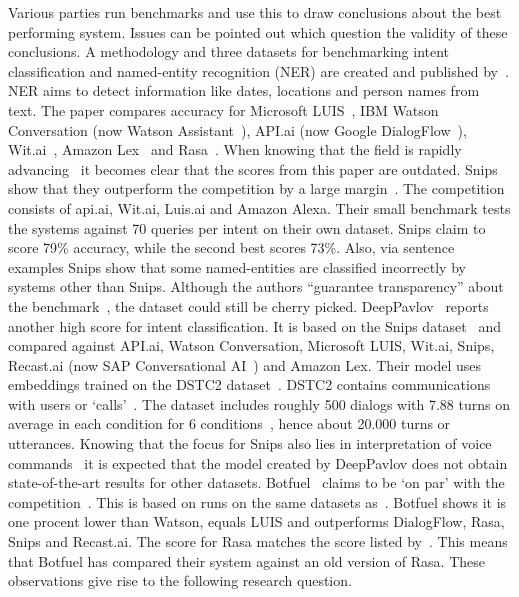 Various parties run benchmarks and use this to draw conclusions about the best performing system.
Issues can be pointed out which question the validity of these conclusions.
A methodology and three datasets for benchmarking intent classification and named-entity recognition (NER) are created and published by~\citet{braun2017}.
NER aims to detect information like dates, locations and person names from text.
The paper compares accuracy for Microsoft LUIS~\citep{microsoft2019luis}, IBM Watson Conversation (now Watson Assistant~\citep{ibm2019assistant}), API.ai (now Google DialogFlow~\citep{google2019dialogflow}), Wit.ai~\citep{facebook2019wit}, Amazon Lex~\citep{amazon2019lex} and Rasa~\citep{bocklisch2017rasa}.
When knowing that the field is rapidly advancing~\citep{young2018recent} it becomes clear that the scores from this paper are outdated.
Snips~\citep{snips2019voice} show that they outperform the competition by a large margin~\citep{snips2017benchmarking}.
The competition consists of api.ai, Wit.ai, Luis.ai and Amazon Alexa.
Their small benchmark tests the systems against 70 queries per intent on their own dataset.
Snips claim to score 79\% accuracy, while the second best scores 73\%.
Also, via sentence examples Snips show that some named-entities are classified incorrectly by systems other than Snips.
Although the authors ``guarantee transparency'' about the benchmark~\citep{snips2017dataset}, the dataset could still be cherry picked.
DeepPavlov~\citep{burtsev2018} reports another high score for intent classification.
It is based on the Snips dataset~\citep{snips2017dataset} and compared against API.ai, Watson Conversation, Microsoft LUIS, Wit.ai, Snips, Recast.ai (now SAP Conversational AI~\citep{sap2019conversational}) and Amazon Lex.
Their model uses embeddings trained on the DSTC2 dataset~\citep{baymurzina2019classifiers,baymurzina2019intents}.
DSTC2 contains communications with users or `calls'~\citep{henderson2014second}.
The dataset includes roughly 500 dialogs with 7.88 turns on average in each condition for 6 conditions~\citep{henderson2014second}, hence about 20.000 turns or utterances.
Knowing that the focus for Snips also lies in interpretation of voice commands~\citep{snips2019voice} it is expected that the model created by DeepPavlov does not obtain state-of-the-art results for other datasets.
Botfuel~\citep{botfuel2019} claims to be `on par' with the competition~\citep{botfuel2018benchmark}.
This is based on runs on the same datasets as~\citet{braun2017}.
Botfuel shows it is one procent lower than Watson, equals LUIS and outperforms DialogFlow, Rasa, Snips and Recast.ai.
The score for Rasa matches the score listed by~\citet{braun2017}.
This means that Botfuel has compared their system against an old version of Rasa.
These observations give rise to the following research question.\\

